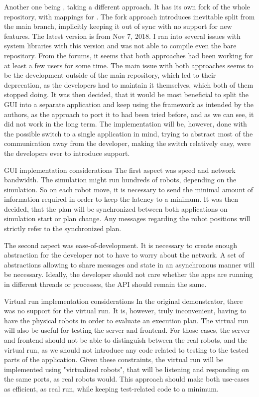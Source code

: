Another one being {\ofnode}, taking a different approach. It has its own fork of the whole {\of} repository, with mappings for {\cmake}. The fork approach introduces inevitable split from the main branch, implicitly keeping it out of sync with no support for new features. \br
The latest version is from Nov 7, 2018. I ran into several issues with system libraries with this version and was not able to compile even the bare repository.\br\br
From the forums, it seems that both approaches had been working for at least a few users for some time. The main issue with both approaches seems to be the development outside of the main repository, which led to their deprecation, as the developers had to maintain it themselves, which both of them stopped doing.
It was then decided, that it would be most beneficial to split the GUI into a separate application and keep using the framework as intended by the authors, as the approach to port it to {\cmake} had been tried before, and as we can see, it did not work in the long term.\br\br
The implementation will be, however, done with the possible switch to a single application in mind, trying to abstract most of the communication away from the developer, making the switch relatively easy, were the developers ever to introduce {\cmake} support.

\sec GUI implementation considerations
The first aspect was speed and network bandwidth. The simulation might run hundreds of robots, depending on the simulation. So on each robot move, it is necessary to send the minimal amount of information required in order to keep the latency to a minimum. 
It was then decided, that the plan will be synchronized between both applications on simulation start or plan change. Any messages regarding the robot positions will strictly refer to the synchronized plan.

The second aspect was ease-of-development. It is necessary to create enough abstraction for the developer not to have to worry about the network. A set of abstractions allowing to share messages and state in an asynchronous manner will be necessary. Ideally, the developer should not care whether the apps are running in different threads or processes, the API should remain the same.

\sec Virtual run implementation considerations
In the original demonstrator, there was no support for the virtual run. It is, however, truly inconvenient, having to have the physical robots in order to evaluate an execution plan. The virtual run will also be useful for testing the server and frontend. For those cases, the server and frontend should not be able to distinguish between the real robots, and the virtual run, as we should not introduce any code related to testing to the tested parts of the application. Given these constraints, the virtual run will be implemented using "virtualized robots", that will be listening and responding on the same ports, as real robots would. This approach should make both use-cases as efficient, as real run, while keeping test-related code to a minimum.

